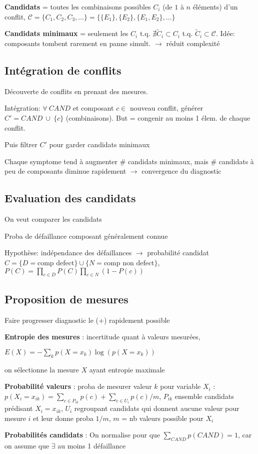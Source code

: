 \textbf{Candidats} = toutes les combinaisons possibles $C_i$ (de $1$ à $n$ éléments) d'un conflit, $\mathcal{C} = \{C_1,C_2,C_3,\dots\} = \{\{E_1\},\{E_2\},\{E_1,E_2\},\dots\}$

\textbf{Candidats minimaux} = seulement les $C_i$ t.q. $\nexists \tilde C_i \subset C_i$ t.q. $\tilde C_i \subset \mathcal{C}$. Idée: composants tombent rarement en panne simult. $\rightarrow$ réduit complexité 


\subsection*{Intégration de conflits}

Découverte de conflits en prenant des mesures. 

Intégration: $\forall \: CAND$ et composant $c \in $ nouveau conflit, générer $C' = CAND \: \cup \: \{c\}$ (combinaisons). But = congenir au moins 1 élem. de chaque conflit.

Puis filtrer $C'$ pour garder candidats minimaux

Chaque symptome tend à augmenter \# candidats minimaux, mais \# candidats à peu de composants diminue rapidement $\rightarrow$ convergence du diagnostic

\subsection*{Evaluation des candidats}

On veut comparer les candidats

Proba de défaillance composant généralement connue

Hypothèse: indépendance des défaillances $\rightarrow$ probabilité candidat $C = \{D = \text{comp defect}\} \cup \{N = \text{comp non defect}\}$, $P(C) = \prod_{c\in D}P(C) \prod_{c\in N} (1-P(c))$


\subsection*{Proposition de mesures}

Faire progresser diagnostic le (+) rapidement possible

\textbf{Entropie des mesures} : incertitude quant à valeurs mesurées, 

$E(X) = - \sum_k p(X=x_k) \log{(p(X=x_k))}$

on sélectionne la mesure $X$ ayant entropie maximale

\textbf{Probabilité valeurs} : proba de mesurer valeur $k$ pour variable $X_i$ : $p(X_i = x_{ik}) = \sum_{c\in P_{ik}} p(c) + \sum_{c\in U_i} p(c)/m$, $P_{ik}$ ensemble candidats prédisant $X_i=x_{ik}$, $U_i$ regroupant candidats qui donnent aucune valeur pour mesure $i$ et leur donne proba $1/m$, $m$ = nb valeurs possible pour $X_i$


\textbf{Probabilités candidats} : On normalise pour que $\sum_{CAND} p(CAND) = 1$, car on assume que $\exists$ au moins 1 défaillance

